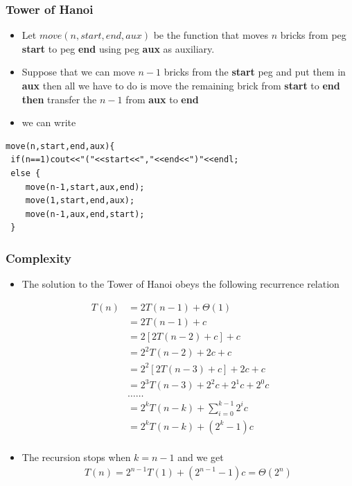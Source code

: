 \documentclass{beamer}
\begin{document}
\begin{frame}[fragile]
  \frametitle{Tower of Hanoi}
  \begin{itemize}
  \item Let $move(n,start,end,aux)$ be the function that moves $n$ bricks from peg \textbf{start} to peg \textbf{end} using peg \textbf{aux} as auxiliary.
  \item Suppose that we can move $n-1$ bricks from the \textbf{start} peg and put them in \textbf{ aux} then all we have to do is move the remaining brick from \textbf{ start}
 to \textbf{end}\textbf{ then } transfer the $n-1$ from \textbf{ aux} to \textbf{ end}
\item we can write
  \end{itemize}
\begin{lstlisting}
move(n,start,end,aux){
 if(n==1)cout<<"("<<start<<","<<end<<")"<<endl;
 else { 
    move(n-1,start,aux,end);
    move(1,start,end,aux);
    move(n-1,aux,end,start);
 } 
\end{lstlisting}
\end{frame}
\begin{frame}
  \frametitle{Complexity}
  \begin{itemize}
  \item The solution to the Tower of Hanoi obeys the following recurrence relation
  \end{itemize}
    \begin{align*}
      T(n)&=2T(n-1)+\Theta(1)\\
          &=2T(n-1)+c\\
          &=2\left[2T(n-2)+c \right]+c\\
          &=2^2T(n-2)+2c+c\\
          &=2^2\left[2T(n-3)+c \right]+2c+c\\
          &=2^3T(n-3)+2^2c+2^1c+2^0c\\
          &\ldots\ldots\\
          &=2^kT(n-k)+\sum_{i=0}^{k-1}2^ic\\
          &=2^kT(n-k)+(2^k-1)c\\
    \end{align*}

\end{frame}
\begin{frame}
  \begin{itemize}
  \item The recursion stops when $k=n-1$ and we get
    \begin{align*}
      T(n)=2^{n-1}T(1)+(2^{n-1}-1)c=\Theta(2^n)
    \end{align*}
  \end{itemize}
\end{frame}
\end{document}
